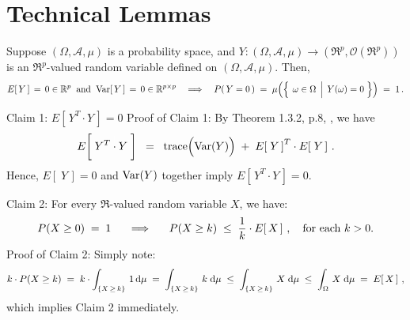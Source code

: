 

\section{Technical Lemmas}
\setcounter{theorem}{0}
\setcounter{equation}{0}

\renewcommand{\theenumi}{\roman{enumi}}
\renewcommand{\labelenumi}{\textnormal{(\theenumi)}$\;\;$}

\begin{lemma}
\mbox{}\vskip 0.1cm
\noindent
Suppose $(\Omega,\mathcal{A},\mu)$ is a probability space, and
$Y : (\Omega,\mathcal{A},\mu) \longrightarrow (\Re^{p},\mathcal{O}(\Re^{p}))$
is an $\Re^{p}$-valued random variable defined on $(\Omega,\mathcal{A},\mu)$.
Then,
\begin{equation*}
E\!\left[\,Y\,\right] \,=\, 0 \in \Re^{p}
\;\;\textnormal{and}\;\;
\Var\!\left[\,Y\,\right] \,=\, 0 \in \Re^{p \times p}
\quad\Longrightarrow\quad
P\!\left(\,Y\overset{{\color{white}.}}{=}0\,\right)
\;=\;
	\mu\!\left(\left\{\;\left.\omega\overset{{\color{white}.}}{\in}\Omega\,\;\right\vert\;Y(\omega) = 0\;\right\}\right)
\;=\;
	1\,.
\end{equation*}
\end{lemma}
\proof
\vskip 0.3cm
\noindent
\textnormal{Claim 1:}\quad
$E\!\left[\,Y^{T}\cdot Y\,\right] = 0$
\vskip 0.3cm
\noindent
Proof of Claim 1:\quad
By Theorem 1.3.2, p.8, \cite{Christensen2011}, we have
\begin{equation*}
E\!\left[\;Y^{T} \overset{{\color{white}\vert}}{\cdot} Y\;\right]
\;\; = \;\;
	\trace\!\left(\Var(\overset{{\color{white}.}}{Y})\right)
	\; + \;
	E\!\left[\;Y\,\right]^{T} \cdot E\!\left[\;Y\,\right]\,.
\end{equation*}
Hence, $E\!\left[\;Y\,\right] = 0$ and $\textnormal{Var}(Y)$ together imply $E\!\left[\,Y^{T}\cdot Y\,\right] = 0$.

\vskip 0.5cm
\noindent
\textnormal{Claim 2:}\quad
For every $\Re$-valued random variable $X$, we have:
\begin{equation*}
P(X \geq 0) \;=\; 1
\quad\;\;\Longrightarrow\quad\;\;
P(X \geq k) \;\leq\; \dfrac{1}{k}\cdot E\!\left[\,X\,\right]\,,
\quad
\textnormal{for each $k > 0$}.
\end{equation*}
Proof of Claim 2:\quad
Simply note:
\begin{equation*}
k \cdot P(X \geq k)
\;=\; k\cdot\int_{\{X\,\geq\,k\}}\,1\,\textnormal{d}\mu
\;=\; \int_{\{X\,\geq\,k\}}\,k\;\textnormal{d}\mu
\;\leq\; \int_{\{X\,\geq\,k\}}\,X\;\textnormal{d}\mu
\;\leq\; \int_{\Omega}\,X\;\textnormal{d}\mu
\;=\; E\!\left[\,X\,\right]\,,
\end{equation*}
which implies Claim 2 immediately.

